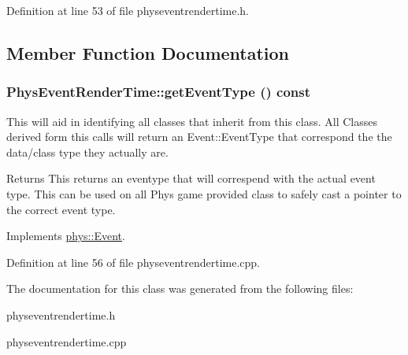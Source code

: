 Definition at line 53 of file physeventrendertime.h.

\subsection{Member Function Documentation}
\hypertarget{classPhysEventRenderTime_a96b0569f8b1cd459383318c9437130d4}{
\subsubsection[{getEventType}]{ PhysEventRenderTime::getEventType () const}}
\label{d4/d83/classPhysEventRenderTime_a96b0569f8b1cd459383318c9437130d4}


This will aid in identifying all classes that inherit from this class. All Classes derived form this calls will return an Event::EventType that correspond the the data/class type they actually are. \begin{DoxyReturn}{Returns}
This returns an eventype that will correspend with the actual event type. This can be used on all Phys game provided class to safely cast a pointer to the correct event type. 
\end{DoxyReturn}


Implements \hyperlink{classphys_1_1Event_ac2c0623a6bc399e62f4b9fb2c022ea73}{phys::Event}.

Definition at line 56 of file physeventrendertime.cpp.

The documentation for this class was generated from the following files:\begin{DoxyCompactItemize}
\item 
physeventrendertime.h\item 
physeventrendertime.cpp\end{DoxyCompactItemize}
